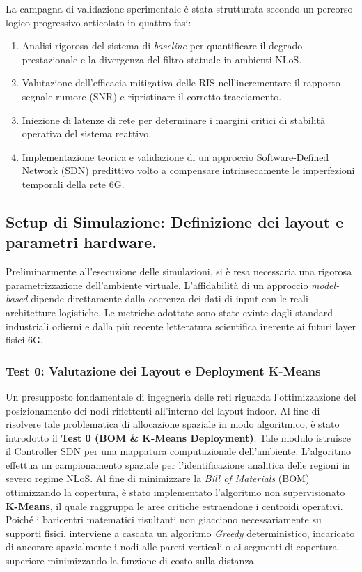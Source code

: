\documentclass[twoside]{article}
\begin{document}
La campagna di validazione sperimentale è stata strutturata secondo un percorso logico progressivo articolato in quattro fasi:
\begin{enumerate}
    \item Analisi rigorosa del sistema di \textit{baseline} per quantificare il degrado prestazionale e la divergenza del filtro statuale in ambienti NLoS.
    \item Valutazione dell'efficacia mitigativa delle RIS nell'incrementare il rapporto segnale-rumore (SNR) e ripristinare il corretto tracciamento.
    \item Iniezione di latenze di rete per determinare i margini critici di stabilità operativa del sistema reattivo.
    \item Implementazione teorica e validazione di un approccio Software-Defined Network (SDN) predittivo volto a compensare intrinsecamente le imperfezioni temporali della rete 6G.
\end{enumerate}

\subsection{Setup di Simulazione: Definizione dei layout e parametri hardware.}

Preliminarmente all'esecuzione delle simulazioni, si è resa necessaria una rigorosa parametrizzazione dell'ambiente virtuale. L'affidabilità di un approccio \textit{model-based} dipende direttamente dalla coerenza dei dati di input con le reali architetture logistiche. Le metriche adottate sono state evinte dagli standard industriali odierni e dalla più recente letteratura scientifica inerente ai futuri layer fisici 6G.

\subsubsection{Test 0: Valutazione dei Layout e Deployment K-Means}
Un presupposto fondamentale di ingegneria delle reti riguarda l'ottimizzazione del posizionamento dei nodi riflettenti all'interno del layout indoor. Al fine di risolvere tale problematica di allocazione spaziale in modo algoritmico, è stato introdotto il \textbf{Test 0 (BOM \& K-Means Deployment)}. 
Tale modulo istruisce il Controller SDN per una mappatura computazionale dell'ambiente. L'algoritmo effettua un campionamento spaziale per l'identificazione analitica delle regioni in severo regime NLoS. Al fine di minimizzare la \textit{Bill of Materials} (BOM) ottimizzando la copertura, è stato implementato l'algoritmo non supervisionato \textbf{K-Means}, il quale raggruppa le aree critiche estraendone i centroidi operativi. Poiché i baricentri matematici risultanti non giacciono necessariamente su supporti fisici, interviene a cascata un algoritmo \textit{Greedy} deterministico, incaricato di ancorare spazialmente i nodi alle pareti verticali o ai segmenti di copertura superiore minimizzando la funzione di costo sulla distanza.
\end{document}
